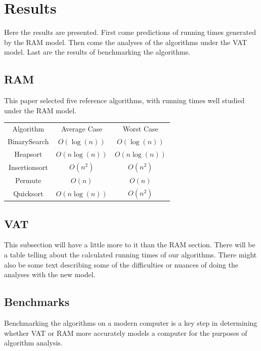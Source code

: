 \section{Results}

  Here the results are presented. First come predictions of running times
  generated by the RAM model. Then come the analyses of the algorithms under
  the VAT model. Last are the results of benchmarking the algorithms.

  \subsection{RAM}
    This paper selected five reference algorithms, with running times well 
    studied under the RAM model.
    
    \begin{tabular}{ccc}
      Algorithm     & Average Case  & Worst Case   \\
      BinarySearch  & $O(\log(n))$  & $O(\log(n))$ \\
      Heapsort      & $O(n\log(n))$ & $O(n\log(n))$\\
      Insertionsort & $O(n^2)$      & $O(n^2)$     \\
      Permute       & $O(n)$        & $O(n)$       \\
      Quicksort     & $O(n\log(n))$ & $O(n^2)$     \\
    \end{tabular}

  \subsection{VAT}
     This subsection will have a little more to it than the RAM section. There
     will be a table telling about the calculated running times of our 
     algorithms. There might also be some text describing some of the 
     difficulties or nuances of doing the analyses with the new model.

  \subsection{Benchmarks}
    Benchmarking the algorithms on a modern computer is a key step in
    determining whether VAT or RAM more accurately models a computer for the
    purposes of algorithm analysis.
    
